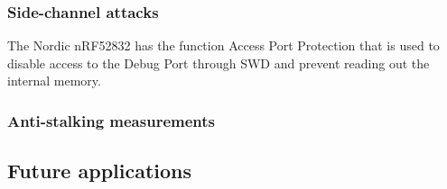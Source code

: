 \documentclass[english]{article}
\begin{document}
\subsubsection{Side-channel attacks}
The Nordic nRF52832 has the function Access Port Protection\cite{nordicsemi} that is used to disable access to the Debug Port through SWD and prevent reading out the internal memory. 
\subsubsection{Anti-stalking measurements}
\subsection{Future applications}



\printbibliography
\nocite{*}
\end{document}
